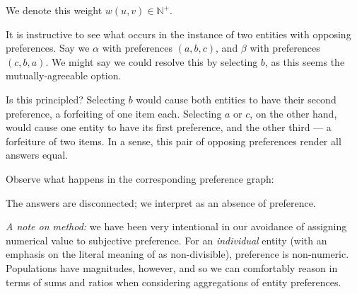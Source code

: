 We denote this weight $w(u,v) \in \mathbb{N}^+$.

It is instructive to see what occurs in the instance of two entities with opposing preferences.
Say we $\alpha$ with preferences $(a, b, c)$, and $\beta$ with preferences $(c, b, a)$.
We might say we could resolve this by selecting $b$, as this seems the mutually-agreeable option.

Is this principled?
Selecting $b$ would cause both entities to have their second preference, a forfeiting of one item each.
Selecting $a$ or $c$, on the other hand, would cause one entity to have its first preference, and the other third --- a forfeiture of two items.
In a sense, this pair of opposing preferences render all answers equal.

Observe what happens in the corresponding preference graph:

\begin{center}
\hspace{5mm}
\raisebox{2 cm}{$\rightarrow$}
\hspace{5mm}
\end{center}

The answers are disconnected; we interpret as an absence of preference.

\bigskip

\textit{A note on method:} we have been very intentional in our avoidance of assigning numerical value to subjective preference.
For an \textit{individual} entity (with an emphasis on the literal meaning of  as non-divisible), preference is non-numeric.
Populations have magnitudes, however, and so we can comfortably reason in terms of sums and ratios when considering aggregations of entity preferences.

